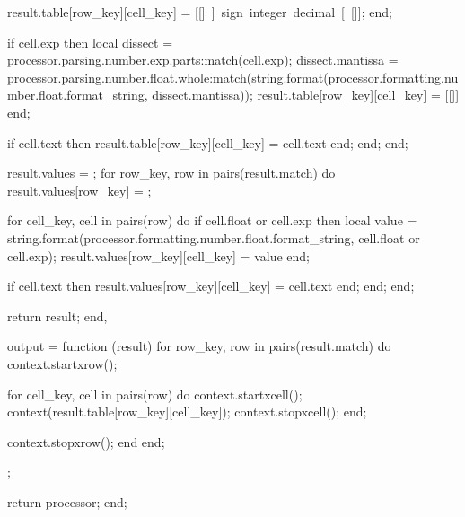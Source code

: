 {                        result.table[row_key][cell_key] = [[\unit{]] .. sign .. integer .. decimal .. [[}]];
                    end;

                    if cell.exp then
                        local dissect = processor.parsing.number.exp.parts:match(cell.exp);
                        dissect.mantissa = processor.parsing.number.float.whole:match(string.format(processor.formatting.number.float.format_string, dissect.mantissa));
                        result.table[row_key][cell_key] = [[\m{]]
                            .. [[\unit{]] .. dissect.mantissa .. [[}]]
                            .. [[ \times 10^{]]
                            .. [[\unit{]] .. dissect.exp_sign .. dissect.exponent .. [[}]]
                            .. [[}]]
                            .. [[}]]
                    end;

                    if cell.text then
                        result.table[row_key][cell_key] = cell.text
                    end;
                end;
            end;

            result.values = {};
            for row_key, row in pairs(result.match) do
                result.values[row_key] = {};

                for cell_key, cell in pairs(row) do
                    if cell.float or cell.exp then
                        local value = string.format(processor.formatting.number.float.format_string, cell.float or cell.exp);
                        result.values[row_key][cell_key] = value
                    end;

                    if cell.text then
                        result.values[row_key][cell_key] = cell.text
                    end;
                end;
            end;

            return result;
        end,

        output = function (result)
            for row_key, row in pairs(result.match) do
                context.startxrow();

                for cell_key, cell in pairs(row) do
                    context.startxcell();
                    context(result.table[row_key][cell_key]);
                    context.stopxcell();
                end;

                context.stopxrow();
            end
        end;
    };

    return processor;
end;

\stopluacode

\stopenvironment
